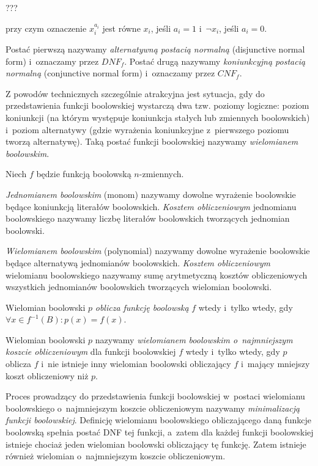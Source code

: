 \documentclass[a4paper,11pt,twoside]{article}
\theoremstyle{definition}
\begin{document}
???

przy czym oznaczenie $x_i^{a_i}$ jest równe $x_i$, jeśli $a_i=1$ i~$\neg x_i$, jeśli $a_i=0$.

Postać pierwszą nazywamy {\em alternatywną postacią normalną} (disjunctive normal form) i~oznaczamy przez $\mathit{DNF}_f$. Postać drugą nazywamy {\em koniunkcyjną postacią normalną} (conjunctive normal form) i~oznaczamy przez $\mathit{CNF}_f$.

Z powodów technicznych szczególnie atrakcyjna jest sytuacja, gdy do przedstawienia funkcji boo\-lowskiej wystarczą dwa tzw. poziomy logiczne: poziom koniunkcji (na którym występuje koniunkcja stałych lub zmiennych boolowskich) i~poziom alternatywy (gdzie wyrażenia koniunkcyjne z~pierwszego poziomu tworzą alternatywę). Taką postać funkcji boolowskiej nazywamy {\em wielomianem boolowskim}.

Niech $f$ będzie funkcją boolowską $n$-zmiennych.

{\em Jednomianem boolowskim} (monom) nazywamy dowolne wyrażenie boolowskie będące koniunkcją literałów boolowskich. {\em Kosztem obliczeniowym} jednomianu boolowskiego nazywamy liczbę literałów boolowskich tworzących jednomian boolowski.

{\em Wielomianem boolowskim} (polynomial) nazywamy dowolne wyrażenie boolowskie będące alternatywą jednomianów boolowskich. {\em Kosztem obliczeniowym} wielomianu boolowskiego nazywamy sumę arytmetyczną kosztów obliczeniowych wszystkich jednomianów boolowskich tworzących wielomian boolowski.

Wielomian boolowski $p$ {\em oblicza funkcję boolowską} $f$ wtedy i~tylko wtedy, gdy\\ $\forall x \in f^{-1}(B)\colon p(x) = f(x)$.

Wielomian boolowski $p$ nazywamy {\em wielomianem boolowskim o~najmniejszym koszcie obliczeniowym} dla funkcji boolowskiej $f$ wtedy i~tylko wtedy, gdy $p$ oblicza $f$ i~nie istnieje inny wielomian boolowski obliczający $f$ i~mający mniejszy koszt obliczeniowy niż $p$.

Proces prowadzący do przedstawienia funkcji boolowskiej w~postaci wielomianu boolowskiego o~najmniejszym koszcie obliczeniowym nazywamy {\em minimalizacją funkcji boolowskiej}. Definicję wielomianu boolowskiego obliczającego daną funkcje boolowską spełnia postać DNF tej funkcji, a~zatem dla każdej funkcji boolowskiej istnieje chociaż jeden wielomian boolowski obliczający tę funkcję. Zatem istnieje również wielomian o~najmniejszym koszcie obliczeniowym.
\end{document}
